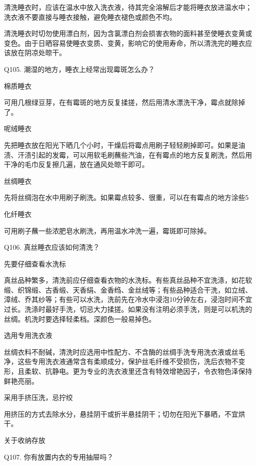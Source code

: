 \documentclass[12pt,UTF8]{ctexbook}
\begin{document}
清洗睡衣时，应该在温水中放入洗衣液，待其完全溶解后才能将睡衣放进温水中；洗衣液不要直接与睡衣接触，避免睡衣褪色或颜色不均。

清洗睡衣时切勿使用漂白剂，因为含氯漂白剂会损害衣物的面料甚至使睡衣变黄或变色。由于日晒容易使睡衣变质、变黄，影响它的使用寿命，所以清洗完的睡衣应该放在阴凉处晾干。





Q105. 潮湿的地方，睡衣上经常出现霉斑怎么办？


棉质睡衣

可用几根绿豆芽，在有霉斑的地方反复揉搓，然后用清水漂洗干净，霉点就除掉了。

呢绒睡衣

先把睡衣放在阳光下晒几个小时，干燥后将霉点用刷子轻轻刷掉即可。如果是油渍、汗渍引起的发霉，可以用软毛刷蘸些汽油，在有霉点的地方反复刷洗，然后用干净的毛巾反复擦几遍，放在通风处晾干即可。

丝绸睡衣

先将丝绸泡在水中用刷子刷洗。如果霉点较多、很重，可以在有霉点的地方涂些5%

化纤睡衣

可用刷子蘸一些浓肥皂水刷洗，再用温水冲洗一遍，霉斑即可除掉。





Q106. 真丝睡衣应该如何清洗？


先要仔细查看水洗标

真丝品种繁多，清洗前应仔细查看衣物的水洗标。有些真丝品种不宜洗涤，如花软缎、织锦缎、古香缎、天香绢、金香绉、金丝绒等；有些品种适合干洗，如立绒、漳绒、乔其纱等；有些可以水洗，洗前先在冷水中浸泡10分钟左右，浸泡时间不宜过长。洗涤时最好手洗，切忌大力揉搓。如果没有注明必须手洗，则是可以机洗的丝绸。机洗时要选择轻柔档。深颜色一般易掉色。

选用专用洗衣液

丝绸衣料不耐碱，清洗时应选用中性配方、不含酶的丝绸手洗专用洗衣液或丝毛净，这些专用洗衣液通常含有柔顺成分，保护丝毛纤维不受损伤，洗后衣物不变形，且柔软、抗静电。更为专业的洗衣液里还含有特效增艳因子，令衣物色泽保持鲜艳亮丽。

采用手挤压洗，忌拧绞

用挤压的方式去除水分，悬挂阴干或折半悬挂阴干；切勿在阳光下暴晒，不宜烘干。





关于收纳存放


Q107. 你有放置内衣的专用抽屉吗？
\end{document}
